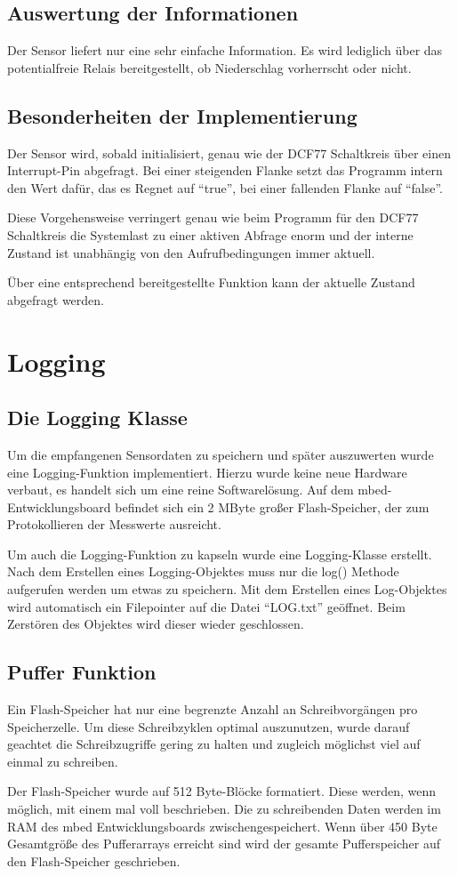 		\subsection{Auswertung der Informationen}
			Der Sensor liefert nur eine sehr einfache Information. Es wird lediglich über das potentialfreie Relais bereitgestellt, ob Niederschlag vorherrscht oder nicht.
		\subsection{Besonderheiten der Implementierung}
			Der Sensor wird, sobald initialisiert, genau wie der DCF77 Schaltkreis über einen Interrupt-Pin abgefragt. Bei einer steigenden Flanke setzt das Programm intern den Wert dafür, das es Regnet auf \enquote{true}, bei einer fallenden Flanke auf \enquote{false}.
			
			Diese Vorgehensweise verringert genau wie beim Programm für den DCF77 Schaltkreis die Systemlast zu einer aktiven Abfrage enorm und der interne Zustand ist unabhängig von den Aufrufbedingungen immer aktuell.
			
			Über eine entsprechend bereitgestellte Funktion kann der aktuelle Zustand abgefragt werden.
	\section{Logging}
		\subsection{Die Logging Klasse}
		Um die empfangenen Sensordaten zu speichern und später auszuwerten wurde eine Logging-Funktion implementiert. Hierzu wurde keine neue Hardware verbaut, es handelt sich um eine reine Softwarelösung. Auf dem mbed-Entwicklungsboard befindet sich ein 2 MByte großer Flash-Speicher, der zum Protokollieren der Messwerte ausreicht.
		
		Um auch die Logging-Funktion zu kapseln wurde eine Logging-Klasse erstellt. Nach dem Erstellen eines Logging-Objektes muss nur die log() Methode aufgerufen werden um etwas zu speichern. Mit dem Erstellen eines Log-Objektes wird automatisch ein Filepointer auf die Datei \enquote{LOG.txt} geöffnet. Beim Zerstören des Objektes wird dieser wieder geschlossen.
		\subsection{Puffer Funktion}
		Ein Flash-Speicher hat nur eine begrenzte Anzahl an Schreibvorgängen pro Speicherzelle. Um diese Schreibzyklen optimal auszunutzen, wurde darauf geachtet die Schreibzugriffe gering zu halten und zugleich möglichst viel auf einmal zu schreiben.
		
		Der Flash-Speicher wurde auf 512 Byte-Blöcke formatiert. Diese werden, wenn möglich, mit einem mal voll beschrieben. Die zu schreibenden Daten werden im RAM des mbed Entwicklungsboards zwischengespeichert. Wenn über 450 Byte Gesamtgröße des Pufferarrays erreicht sind wird der gesamte Pufferspeicher auf den Flash-Speicher geschrieben.